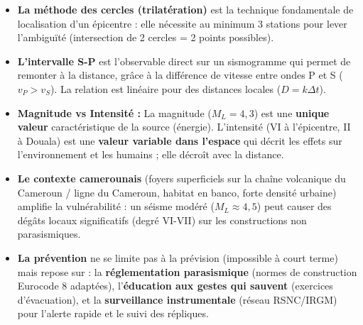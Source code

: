 \documentclass[11pt]{article}
\newcounter{popsec}
\newcounter{popsub}
\newcommand{\courssub}[1]{%
  \stepcounter{popsub}%
  \par\vspace{9pt}\noindent{\popxbold\fontsize{11.5}{13}\selectfont\color{popink}{\color{poporange}\thepopsec.\thepopsub}\hspace{6pt}#1}\par\nopagebreak\vspace{4pt}
}
\begin{document}
\courssub{Bilan de l'activité}
\begin{aretenir}
\begin{itemize}
    \item \textbf{La méthode des cercles (trilatération)} est la technique fondamentale de localisation d'un épicentre : elle nécessite au minimum 3 stations pour lever l'ambiguïté (intersection de 2 cercles = 2 points possibles).
    \item \textbf{L'intervalle S-P} est l'observable direct sur un sismogramme qui permet de remonter à la distance, grâce à la différence de vitesse entre ondes P et S ($v_P > v_S$). La relation est linéaire pour des distances locales ($D = k \Delta t$).
    \item \textbf{Magnitude vs Intensité :} La magnitude ($M_L = 4,3$) est une \textbf{unique valeur} caractéristique de la source (énergie). L'intensité (VI à l'épicentre, II à Douala) est une \textbf{valeur variable dans l'espace} qui décrit les effets sur l'environnement et les humains ; elle décroît avec la distance.
    \item \textbf{Le contexte camerounais} (foyers superficiels sur la chaîne volcanique du Cameroun / ligne du Cameroun, habitat en banco, forte densité urbaine) amplifie la vulnérabilité : un séisme modéré ($M_L \approx 4,5$) peut causer des dégâts locaux significatifs (degré VI-VII) sur les constructions non parasismiques.
    \item \textbf{La prévention} ne se limite pas à la prévision (impossible à court terme) mais repose sur : la \textbf{réglementation parasismique} (normes de construction Eurocode 8 adaptées), l'\textbf{éducation aux gestes qui sauvent} (exercices d'évacuation), et la \textbf{surveillance instrumentale} (réseau RSNC/IRGM) pour l'alerte rapide et le suivi des répliques.
\end{itemize}
\end{aretenir}
\end{document}
